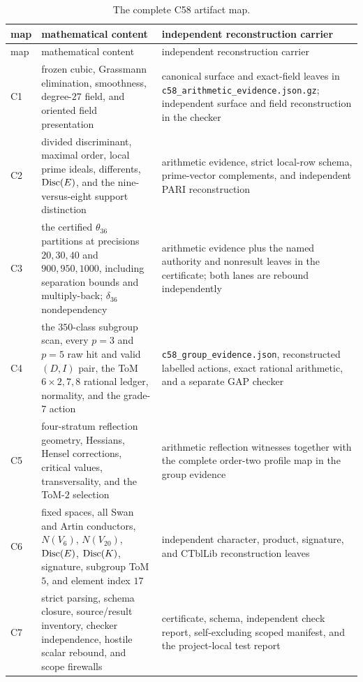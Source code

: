 \begin{longtable}{@{}>{\raggedright\arraybackslash}p{}>{\raggedright\arraybackslash}p{}>{\raggedright\arraybackslash}p{}@{}}
\caption{The complete C58 artifact map.}
\label{tab:artifact-map}\\
\toprule
map&mathematical content&independent reconstruction carrier\\
\midrule
\endfirsthead
\toprule
map&mathematical content&independent reconstruction carrier\\
\midrule
\endhead
C1&frozen cubic, Grassmann elimination, smoothness, degree-$27$ field, and
oriented field presentation&canonical surface and exact-field leaves in
\texttt{c58\_arithmetic\_evidence.json.gz}; independent surface and field
reconstruction in the checker\\
C2&divided discriminant, maximal order, local prime ideals, differents,
$\operatorname{Disc}(E)$, and the nine-versus-eight support distinction&arithmetic evidence,
strict local-row schema, prime-vector complements, and independent PARI
reconstruction\\
C3&the certified $\theta_{36}$ partitions at precisions
$20,30,40$ and $900,950,1000$, including separation bounds and multiply-back;
$\delta_{36}$ nondependency&arithmetic evidence plus the named authority and
nonresult leaves in the certificate; both lanes are rebound independently\\
C4&the $350$-class subgroup scan, every $p=3$ and $p=5$ raw hit and valid
$(D,I)$ pair, the ToM $6\times2,7,8$ rational ledger, normality, and the
grade-$7$ action&\texttt{c58\_group\_evidence.json}, reconstructed labelled
actions, exact rational arithmetic, and a separate GAP checker\\
C5&four-stratum reflection geometry, Hessians, Hensel corrections, critical
values, transversality, and the ToM-$2$ selection&arithmetic reflection
witnesses together with the complete order-two profile map in the group
evidence\\
C6&fixed spaces, all Swan and Artin conductors, $N(V_6)$, $N(V_{20})$,
$\operatorname{Disc}(E)$, $\operatorname{Disc}(K)$, signature, subgroup ToM $5$, and element index $17$&
independent character, product, signature, and CTblLib reconstruction leaves\\
C7&strict parsing, schema closure, source/result inventory, checker
independence, hostile scalar rebound, and scope firewalls&certificate,
schema, independent check report, self-excluding scoped manifest, and the
project-local test report\\
\bottomrule
\end{longtable}

